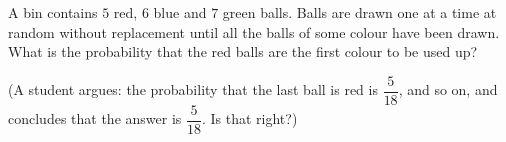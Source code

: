 A bin contains $5$ red, $6$ blue and $7$ green balls. Balls are drawn one at a time at random without replacement until all the balls of some colour have been drawn. What is the probability that the red balls are the first colour to be used up?

(A student argues: the probability that the last ball is red is $\dfrac{5}{18}$, and so on, and concludes that the answer is $\dfrac{5}{18}$. Is that right?)
